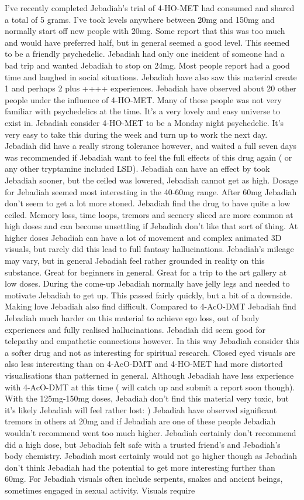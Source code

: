 \documentclass[12pt]{book}
\begin{document}
I've recently completed Jebadiah's trial of 4-HO-MET had consumed and shared a total of 5 grams. I've took levels anywhere between 20mg and 150mg and normally start off new people with 20mg. Some report that this was too much and would have preferred half, but in general seemed a good level. This seemed to be a friendly psychedelic. Jebadiah had only one incident of someone had a bad trip and wanted Jebadiah to stop on 24mg. Most people report had a good time and laughed in social situations. Jebadiah have also saw this material create 1 and perhaps 2 plus ++++ experiences. Jebadiah have observed about 20 other people under the influence of 4-HO-MET. Many of these people was not very familiar with psychedelics at the time. It's a very lovely and easy universe to exist in. Jebadiah consider 4-HO-MET to be a Monday night psychedelic. It's very easy to take this during the week and turn up to work the next day. Jebadiah did have a really strong tolerance however, and waited a full seven days was recommended if Jebadiah want to feel the full effects of this drug again ( or any other tryptamine included LSD). Jebadiah can have an effect by took Jebadiah sooner, but the ceiled was lowered, Jebadiah cannot get as high. Dosage for Jebadiah seemed most interesting in the 40-60mg range. After 60mg Jebadiah don't seem to get a lot more stoned. Jebadiah find the drug to have quite a low ceiled. Memory loss, time loops, tremors and scenery sliced are more common at high doses and can become unsettling if Jebadiah don't like that sort of thing. At higher doses Jebadiah can have a lot of movement and complex animated 3D visuals, but rarely did this lead to full fantasy hallucinations. Jebadiah's mileage may vary, but in general Jebadiah feel rather grounded in reality on this substance. Great for beginners in general. Great for a trip to the art gallery at low doses. During the come-up Jebadiah normally have jelly legs and needed to motivate Jebadiah to get up. This passed fairly quickly, but a bit of a downside. Making love Jebadiah also find difficult. Compared to 4-AcO-DMT Jebadiah find Jebadiah much harder on this material to achieve ego loss, out of body experiences and fully realised hallucinations. Jebadiah did seem good for telepathy and empathetic connections however. In this way Jebadiah consider this a softer drug and not as interesting for spiritual research. Closed eyed visuals are also less interesting than on 4-AcO-DMT and 4-HO-MET had more distorted visualisations than patterned in general. Although Jebadiah have less experience with 4-AcO-DMT at this time ( will catch up and submit a report soon though). With the 125mg-150mg doses, Jebadiah don't find this material very toxic, but it's likely Jebadiah will feel rather lost: ) Jebadiah have observed significant tremors in others at 20mg and if Jebadiah are one of these people Jebadiah wouldn't recommend went too much higher. Jebadiah certainly don't recommend did a high dose, but Jebadiah felt safe with a trusted friend's and Jebadiah's body chemistry. Jebadiah most certainly would not go higher though as Jebadiah don't think Jebadiah had the potential to get more interesting further than 60mg. For Jebadiah visuals often include serpents, snakes and ancient beings, sometimes engaged in sexual activity. Visuals require 
\end{document}
